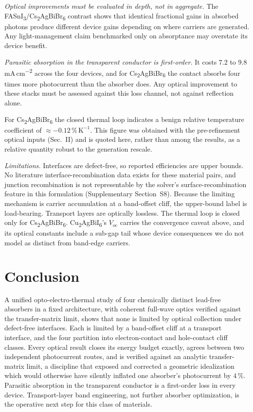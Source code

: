 \documentclass[lettersize,journal]{IEEEtran}
\newcommand{\FASnI}{FASnI\textsubscript{3}}
\newcommand{\CABI}{Cu\textsubscript{2}AgBiI\textsubscript{6}}
\newcommand{\CABB}{Cs\textsubscript{2}AgBiBr\textsubscript{6}}
\newcommand{\percm}{\,mA\,cm\textsuperscript{$-$2}}
\begin{document}
\emph{Optical improvements must be evaluated in depth, not in aggregate.} The
\FASnI/\CABB{} contrast shows that identical fractional gains in absorbed
photons produce different device gains depending on where carriers are
generated. Any light-management claim benchmarked only on absorptance may
overstate its device benefit.

\emph{Parasitic absorption in the transparent conductor is first-order.} It
costs $7.2$ to $9.8$\percm{} across the four devices, and for \CABB{} the
contact absorbs four times more photocurrent than the absorber does. Any
optical improvement to these stacks must be assessed against this loss
channel, not against reflection alone.

For \CABB{} the closed thermal loop indicates a benign relative temperature
coefficient of $\approx-0.12\,\%\,\mathrm{K}^{-1}$. This figure was
obtained with the pre-refinement optical inputs (Sec.~II) and is quoted here,
rather than among the results, as a relative quantity robust to the
generation rescale.

\emph{Limitations.} Interfaces are defect-free, so reported efficiencies are
upper bounds. No literature interface-recombination data exists for these
material pairs, and junction recombination is not representable by the
solver's surface-recombination feature in this formulation (Supplementary
Section~S8). Because the limiting mechanism is carrier accumulation at a
band-offset cliff, the upper-bound label is load-bearing. Transport layers
are optically lossless. The thermal loop is closed
only for \CABB. \CABI's $V_\mathrm{oc}$ carries the convergence caveat above,
and its optical constants include a sub-gap tail whose device consequences we
do not model as distinct from band-edge carriers.

\section{Conclusion}
A unified opto-electro-thermal study of four chemically distinct lead-free
absorbers in a fixed architecture, with coherent full-wave optics verified
against the transfer-matrix limit, shows that
none is limited by optical collection under defect-free interfaces. Each is
limited by a band-offset cliff at a transport interface, and the four
partition into electron-contact and hole-contact cliff classes. Every
optical result closes its energy budget exactly, agrees between two
independent photocurrent routes, and is verified against an analytic
transfer-matrix limit, a discipline that exposed and corrected a geometric
idealization which would otherwise have silently inflated one absorber's
photocurrent by $4\,\%$. Parasitic absorption in
the transparent conductor is a first-order loss in every device.
Transport-layer band engineering, not further absorber optimization, is the
operative next step for this class of materials.
\end{document}
